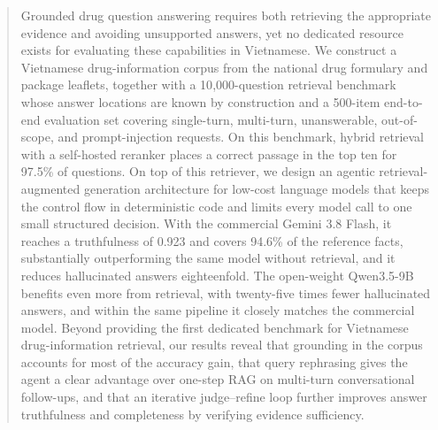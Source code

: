 \begin{abstract}
Grounded drug question answering requires both retrieving the appropriate evidence and avoiding unsupported answers, yet no dedicated resource exists for evaluating these capabilities in Vietnamese. We construct a Vietnamese drug-information corpus from the national drug formulary and package leaflets, together with a 10{,}000-question retrieval benchmark whose answer locations are known by construction and a 500-item end-to-end evaluation set covering single-turn, multi-turn, unanswerable, out-of-scope, and prompt-injection requests. On this benchmark, hybrid retrieval with a self-hosted reranker places a correct passage in the top ten for 97.5\% of questions. On top of this retriever, we design an agentic retrieval-augmented generation architecture for low-cost language models that keeps the control flow in deterministic code and limits every model call to one small structured decision. With the commercial Gemini 3.8 Flash, it reaches a truthfulness of 0.923 and covers 94.6\% of the reference facts, substantially outperforming the same model without retrieval, and it reduces hallucinated answers eighteenfold. The open-weight Qwen3.5-9B benefits even more from retrieval, with twenty-five times fewer hallucinated answers, and within the same pipeline it closely matches the commercial model. Beyond providing the first dedicated benchmark for Vietnamese drug-information retrieval, our results reveal that grounding in the corpus accounts for most of the accuracy gain, that query rephrasing gives the agent a clear advantage over one-step RAG on multi-turn conversational follow-ups, and that an iterative judge--refine loop further improves answer truthfulness and completeness by verifying evidence sufficiency.
\end{abstract}
